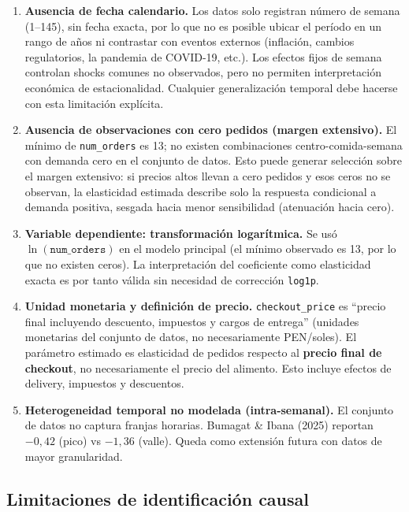 \documentclass[doc, a4paper, biblatex, floatsintext, longtable, babel]{apa7}
\begin{document}
\begin{enumerate}
    \item \textbf{Ausencia de fecha calendario.} Los datos solo registran número de semana (1--145), sin fecha exacta, por lo que no es posible ubicar el período en un rango de años ni contrastar con eventos externos (inflación, cambios regulatorios, la pandemia de COVID-19, etc.). Los efectos fijos de semana controlan shocks comunes no observados, pero no permiten interpretación económica de estacionalidad. Cualquier generalización temporal debe hacerse con esta limitación explícita.

    \item \textbf{Ausencia de observaciones con cero pedidos (margen extensivo).} El mínimo de \texttt{num\_orders} es 13; no existen combinaciones centro-comida-semana con demanda cero en el conjunto de datos. Esto puede generar selección sobre el margen extensivo: si precios altos llevan a cero pedidos y esos ceros no se observan, la elasticidad estimada describe solo la respuesta condicional a demanda positiva, sesgada hacia menor sensibilidad (atenuación hacia cero).

    \item \textbf{Variable dependiente: transformaci\'on logar\'itmica.} Se us\'o $\ln(\texttt{num\_orders})$ en el modelo principal (el m\'inimo observado es 13, por lo que no existen ceros). La interpretaci\'on del coeficiente como elasticidad exacta es por tanto v\'alida sin necesidad de correcci\'on \texttt{log1p}.

    \item \textbf{Unidad monetaria y definición de precio.} \texttt{checkout\_price} es ``precio final incluyendo descuento, impuestos y cargos de entrega'' (unidades monetarias del conjunto de datos, no necesariamente PEN/soles). El parámetro estimado es elasticidad de pedidos respecto al \textbf{precio final de checkout}, no necesariamente el precio del alimento. Esto incluye efectos de delivery, impuestos y descuentos.

    \item \textbf{Heterogeneidad temporal no modelada (intra-semanal).} El conjunto de datos no captura franjas horarias. Bumagat \& Ibana (2025) reportan $-0,42$ (pico) vs $-1,36$ (valle). Queda como extensión futura con datos de mayor granularidad.
\end{enumerate}

\subsection*{Limitaciones de identificación causal}
\end{document}
